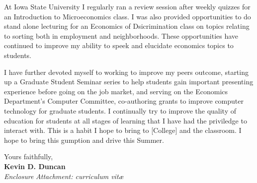 \documentclass[11pt]{article}
\begin{document}
At Iowa State University I regularly ran a review session after weekly quizzes for an Introduction to Microeconomics class. I was also provided opportunities to do stand alone lecturing for an Economics of Dsicrimination class on topics relating to sorting both in employment and neighborhoods. These opportunities have continued to improve my ability to speek and elucidate economics topics to students.

I have further devoted myself to working to improve my peers outcome, starting up a Graduate Student Seminar series to help students gain important presenting experience before going on the job market, and serving on the Economics Department's Computer Committee, co-authoring grants to improve computer technology for graduate students. I continually try to improve the quality of education for students at all stages of learning that I have had the priviledge to interact with. This is a habit I hope to bring to [College] and the classroom. I hope to bring this gumption and drive this Summer.
               
Yours faithfully,\\[2em] %
%
{\bfseries Kevin D. Duncan}\\
%
\vfill%
{\slshape Enclosure}
{\slshape Attachment: curriculum vit\ae{}}
               
\end{document}
